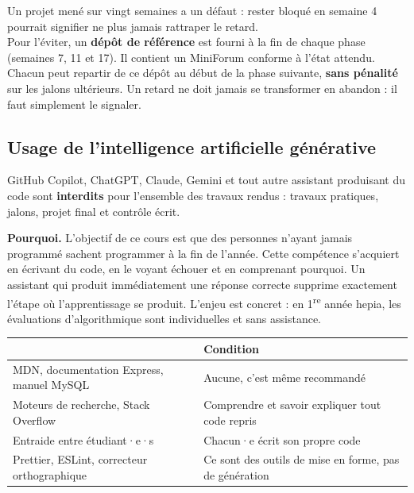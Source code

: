 \documentclass[a4paper,11pt]{article}
\newcommand{\hdr}[1]{\multicolumn{1}{l}{\color{white}\bfseries #1}}
\renewcommand{\arraystretch}{1.3}
\begin{document}
\begin{tcolorbox}[astuce, title={Le filet de sécurité --- dépôts de référence}]
Un projet mené sur vingt semaines a un défaut : rester bloqué en semaine 4 pourrait signifier ne plus jamais rattraper le retard.\\[4pt]
Pour l'éviter, un \textbf{dépôt de référence} est fourni à la fin de chaque phase (semaines 7, 11 et 17). Il contient un MiniForum conforme à l'état attendu. Chacun peut repartir de ce dépôt au début de la phase suivante, \textbf{sans pénalité} sur les jalons ultérieurs. Un retard ne doit jamais se transformer en abandon : il faut simplement le signaler.
\end{tcolorbox}

\subsection{Usage de l'intelligence artificielle générative}

\begin{tcolorbox}[interdit, title={Les assistants de génération de code sont interdits dans ce cours}]
GitHub Copilot, ChatGPT, Claude, Gemini et tout autre assistant produisant du code sont \textbf{interdits} pour l'ensemble des travaux rendus : travaux pratiques, jalons, projet final et contrôle écrit.
\end{tcolorbox}

\vspace{4pt}
\textbf{Pourquoi.} L'objectif de ce cours est que des personnes n'ayant jamais programmé sachent programmer à la fin de l'année. Cette compétence s'acquiert en écrivant du code, en le voyant échouer et en comprenant pourquoi. Un assistant qui produit immédiatement une réponse correcte supprime exactement l'étape où l'apprentissage se produit. L'enjeu est concret : en 1\textsuperscript{re} année hepia, les évaluations d'algorithmique sont individuelles et sans assistance.

\vspace{6pt}
\begin{center}
\renewcommand{\arraystretch}{1.0}
\begin{tabularx}{\linewidth}{p{5.2cm}X}
  \toprule
  \rowcolor{uniNavy}
  \hdr{Autorisé} &  \hdr{Condition} \\
  \midrule
  \rowcolor{uniPaper}
  MDN, documentation Express, manuel MySQL & Aucune, c'est même recommandé \\
  Moteurs de recherche, Stack Overflow & Comprendre et savoir expliquer tout code repris \\
  \rowcolor{uniPaper}
  Entraide entre étudiant·e·s & Chacun·e écrit son propre code \\
  Prettier, ESLint, correcteur orthographique & Ce sont des outils de mise en forme, pas de génération \\
  \bottomrule
\end{tabularx}
\end{center}
\end{document}
